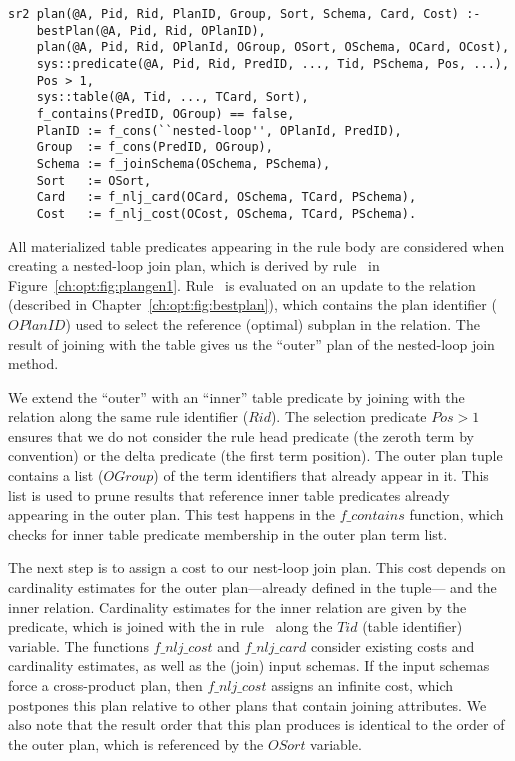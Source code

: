 \begin{figure*}
\ssp
\centering
\begin{lstlisting}
sr2 plan(@A, Pid, Rid, PlanID, Group, Sort, Schema, Card, Cost) :- 
    bestPlan(@A, Pid, Rid, OPlanID),
    plan(@A, Pid, Rid, OPlanId, OGroup, OSort, OSchema, OCard, OCost),
    sys::predicate(@A, Pid, Rid, PredID, ..., Tid, PSchema, Pos, ...),
    Pos > 1,
    sys::table(@A, Tid, ..., TCard, Sort),
    f_contains(PredID, OGroup) == false,
    PlanID := f_cons(``nested-loop'', OPlanId, PredID),
    Group  := f_cons(PredID, OGroup),
    Schema := f_joinSchema(OSchema, PSchema),
    Sort   := OSort,
    Card   := f_nlj_card(OCard, OSchema, TCard, PSchema),
    Cost   := f_nlj_cost(OCost, OSchema, TCard, PSchema).
\end{lstlisting}
\caption{\label{ch:opt:fig:plangen1}nested-loop join method.}
\end{figure*}

All materialized table predicates appearing in the rule body are considered when
creating a nested-loop join plan, which is derived by rule~ in
Figure~\ref{ch:opt:fig:plangen1}.  Rule~ is evaluated on an update to the
 relation (described in Chapter~\ref{ch:opt:fig:bestplan}), which
contains the plan identifier ($OPlanID$) used to select the reference (optimal)
subplan in the  relation.  The result of joining  with 
the  table gives us the ``outer'' plan of the nested-loop join method.

We extend the ``outer''  with an ``inner'' table predicate by joining
with the  relation along the same rule identifier ($Rid$).
The selection predicate $Pos > 1$ ensures that we do not consider the rule head
predicate (the zeroth term by convention) or the delta predicate (the first
term position).  The outer plan tuple contains a list ($OGroup$) of the term
identifiers that already appear in it.  This list is used to prune results that
reference inner table predicates already appearing in the outer plan.  This
test happens in the $f\_contains$ function, which checks for inner table
predicate membership in the outer plan term list.

The next step is to assign a cost to our nest-loop join plan.  This cost
depends on cardinality estimates for the outer plan---already defined in the
 tuple--- and the inner relation.  Cardinality estimates for the inner
relation are given by the  predicate, which is joined with the
 in rule~ along the $Tid$ (table identifier)
variable.  The functions $f\_nlj\_cost$ and $f\_nlj\_card$ consider existing
costs and cardinality estimates, as well as the (join) input schemas.  If the
input schemas force a cross-product plan, then $f\_nlj\_cost$ assigns an
infinite cost, which postpones this plan relative to other plans that contain
joining attributes.  We also note that the result order that this plan produces
is identical to the order of the outer plan, which is referenced by the $OSort$
variable.

